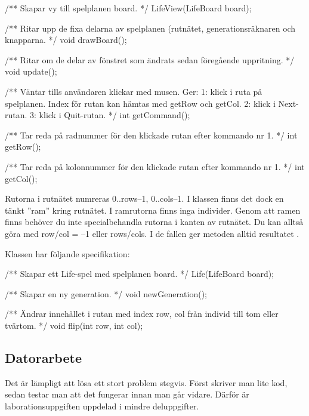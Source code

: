 \begin{Spec}
/** Skapar vy till spelplanen board. */
LifeView(LifeBoard board);

/** Ritar upp de fixa delarna av spelplanen (rutnätet,
    generationsräknaren och knapparna. */
void drawBoard();

/** Ritar om de delar av fönstret som ändrats sedan föregående
    uppritning. */
void update();

/** Väntar tills användaren klickar med musen. Ger:
    1: klick i ruta på spelplanen. Index för rutan kan hämtas med
       getRow och getCol.
    2: klick i Next-rutan.
    3: klick i Quit-rutan. */
int getCommand();

/** Tar reda på radnummer för den klickade rutan efter kommando nr 1. */
int getRow();

/** Tar reda på kolonnummer för den klickade rutan efter kommando nr 1. */
int getCol();
\end{Spec}

\n Rutorna i rutnätet numreras 0..rows--1, 0..cols--1. I klassen  finns det dock en tänkt ''ram'' kring rutnätet. I ramrutorna finns inga individer. Genom att ramen finns behöver du inte specialbehandla rutorna i kanten av rutnätet. Du kan alltså göra  med row/col = --1 eller rows/cols. I de fallen ger metoden  alltid resultatet .

Klassen  har följande specifikation:
\begin{Spec}
/** Skapar ett Life-spel med spelplanen board. */
Life(LifeBoard board);

/** Skapar en ny generation. */
void newGeneration();

/** Ändrar innehållet i rutan med index row, col från individ till tom
    eller tvärtom. */
void flip(int row, int col);
\end{Spec}

\subsection*{Datorarbete}
Det är lämpligt att lösa ett stort problem stegvis. Först skriver man lite kod, sedan
testar man att det fungerar innan man går vidare. Därför är laborationsuppgiften uppdelad
i mindre deluppgifter.

